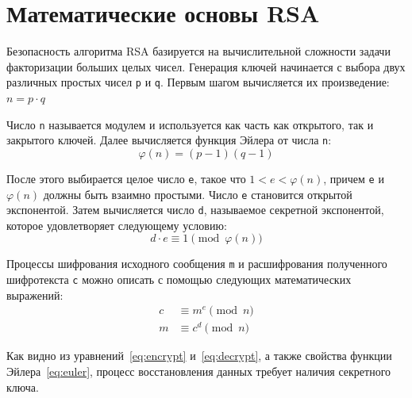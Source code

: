 \section{Математические основы RSA}

Безопасность алгоритма RSA базируется на вычислительной сложности задачи факторизации больших целых чисел. Генерация ключей начинается с выбора двух различных простых чисел \texttt{p} и \texttt{q}. Первым шагом вычисляется их произведение:
$n = p \cdot q$

Число \texttt{n} называется модулем и используется как часть как открытого, так и закрытого ключей. Далее вычисляется функция Эйлера от числа \texttt{n}:
\begin{equation}
\label{eq:euler}
\varphi(n) = (p - 1)(q - 1)
\end{equation}

После этого выбирается целое число \texttt{e}, такое что $1 < e < \varphi(n)$, причем \texttt{e} и $\varphi(n)$ должны быть взаимно простыми. Число \texttt{e} становится открытой экспонентой. Затем вычисляется число \texttt{d}, называемое секретной экспонентой, которое удовлетворяет следующему условию:
\begin{equation}
\label{eq:secret_d}
d \cdot e \equiv 1 \pmod{\varphi(n)}
\end{equation}

Процессы шифрования исходного сообщения \texttt{m} и расшифрования полученного шифротекста \texttt{c} можно описать с помощью следующих математических выражений:
\begin{align}
c &\equiv m^e \pmod{n} \label{eq:encrypt} \\
m &\equiv c^d \pmod{n} \label{eq:decrypt}
\end{align}

Как видно из уравнений~\ref{eq:encrypt} и~\ref{eq:decrypt}, а также свойства функции Эйлера~\ref{eq:euler}, процесс восстановления данных требует наличия секретного ключа.

